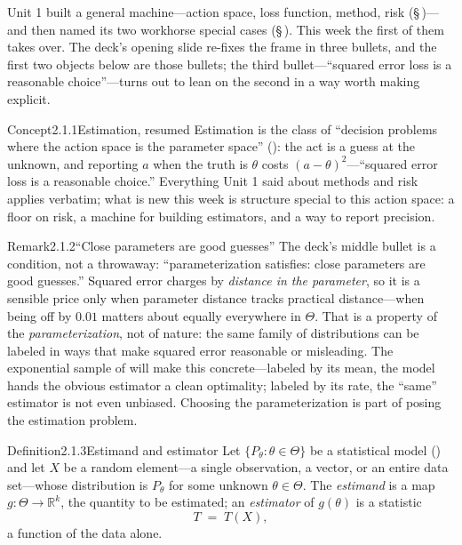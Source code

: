 \documentclass[main.tex]{subfiles}
\begin{document}
\clearpage

Unit 1 built a general machine---action space, loss function, method, risk
(\S\,)---and then named its two workhorse special cases (\S\,). This
week the first of them takes over. The deck's opening slide re-fixes the frame in three
bullets, and the first two objects below are those bullets; the third bullet---``squared
error loss is a reasonable choice''---turns out to lean on the second in a way worth making
explicit.

\begin{ObjL}{Concept}{2.1.1}{Estimation, resumed}
Estimation is the class of ``decision problems where the action space is the parameter
space'' (): the act is a guess at the unknown, and reporting $a$ when the truth
is $\theta$ costs $(a-\theta)^2$---``squared error loss is a reasonable choice.'' Everything
Unit 1 said about methods and risk applies verbatim; what is new this week is structure
special to this action space: a floor on risk, a machine for building estimators, and a way
to report precision.
\end{ObjL}

\begin{ObjL}{Remark}{2.1.2}{``Close parameters are good guesses''}
The deck's middle bullet is a condition, not a throwaway: ``parameterization satisfies:
close parameters are good guesses.'' Squared error charges by \emph{distance in the
parameter}, so it is a sensible price only when parameter distance tracks practical
distance---when being off by $0.01$ matters about equally everywhere in $\Theta$. That is a
property of the \emph{parameterization}, not of nature: the same family of distributions can
be labeled in ways that make squared error reasonable or misleading. The exponential sample
of  will make this concrete---labeled by its mean, the model hands the obvious
estimator a clean optimality; labeled by its rate, the ``same'' estimator is not even
unbiased. Choosing the parameterization is part of posing the estimation problem.
\end{ObjL}

\begin{Obj}{Definition}{2.1.3}{Estimand and estimator}
Let $\{P_{\theta} : \theta\in\Theta\}$ be a statistical model () and let $X$ be
a random element---a single observation, a vector, or an entire data set---whose distribution
is $P_{\theta}$ for some unknown $\theta\in\Theta$. The \emph{estimand} is a map
$g:\Theta\to\mathbb{R}^k$, the quantity to be estimated; an \emph{estimator} of $g(\theta)$
is a statistic
\[ T \;=\; T(X) , \]
a function of the data alone.
\end{Obj}
\end{document}
